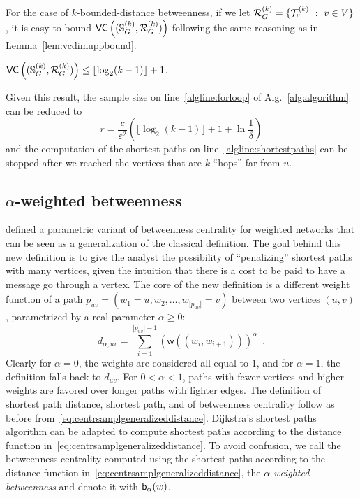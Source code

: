 For the case of $k$-bounded-distance betweenness, if we let
$\mathcal{R}_G^{(k)}=\{\mathcal{T}_v^{(k)}~:~ v\in V\}$, it is easy to bound
$\mathsf{VC}\left((\mathbb{S}^{(k)}_G,\mathcal{R}_G^{(k)})\right)$ following the same reasoning as in
Lemma~\ref{lem:vcdimuppbound}.
\begin{lemma}\label{lem:vcdimuppboundk}
$\mathsf{VC}\left((\mathbb{S}^{(k)}_G,\mathcal{R}_G^{(k)})\right)\le\lfloor\log_2(k-1)\rfloor+1$.
\end{lemma}

Given this result, the sample size on line~\ref{algline:forloop}
of Alg.~\ref{alg:algorithm} can be reduced to 
\[ 
  r= \frac{c}{\varepsilon^2}\left(\lfloor\log_2(k-1)\rfloor + 1 +\ln\frac{1}{\delta}\right)
\]
and the computation of the shortest paths on line~\ref{algline:shortestpaths}
can be stopped after we reached the vertices that are $k$ ``hops'' far from $u$.

\subsection{$\alpha$-weighted betweenness}
\citet{OpsahlAS10} defined a parametric variant of betweenness centrality for
weighted networks that can be seen as a generalization of the classical 
definition. The goal behind this new definition is to give the analyst the
possibility of ``penalizing'' shortest paths with many vertices, given the
intuition that there is a cost to be paid to have a message go through a vertex.
The core of the new definition is a different weight function of a path
$p_{uv}=(w_1=u,w_2,\dotsc,w_{|p_{uv}|}=v)$ between two vertices $(u,v)$,
parametrized by a real parameter $\alpha\ge 0$:
\begin{equation}\label{eq:centrsamplgeneralizeddistance}
d_{\alpha,uv}=\sum_{i=1}^{|p_{uv}|-1}(\mathsf{w}((w_i,w_{i+1})))^\alpha\enspace. 
\end{equation}
Clearly for $\alpha=0$, the weights are considered all equal to $1$, and for
$\alpha=1$, the definition falls back to $d_{uv}$. For $0<\alpha<1$, paths with
fewer vertices and higher weights are favored over longer paths with lighter
edges\citep{OpsahlAS10}. The definition of shortest path distance, shortest
path, and of betweenness centrality follow as before
from~\eqref{eq:centrsamplgeneralizeddistance}. Dijkstra's shortest paths algorithm can be
adapted to compute shortest paths according to the distance function
in~\eqref{eq:centrsamplgeneralizeddistance}. To avoid confusion, we call the betweenness
centrality computed using the shortest paths according to the distance function
in~\eqref{eq:centrsamplgeneralizeddistance}, the \emph{$\alpha$-weighted betweenness} and
denote it with $\mathsf{b}_\alpha(w)$. 

